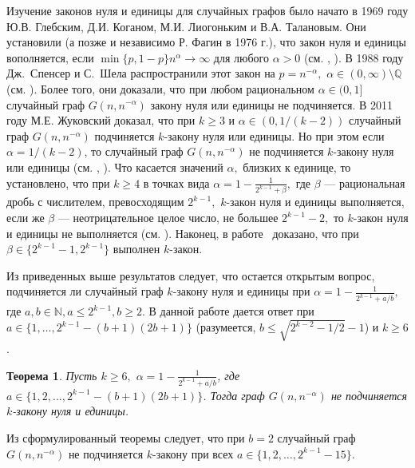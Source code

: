 \documentclass[12pt,a4paper,russian,titlepage]{article}
\newtheorem{Th}{Теорема}
\begin{document}
Изучение законов нуля и единицы для случайных графов было начато в 1969 году Ю.В. Глебским, Д.И. Коганом,
М.И. Лиогоньким и В.А. Талановым. Они установили (а позже и независимо Р. Фагин в 1976 г.), что закон нуля и единицы вополняется, если  $\min\{p,1-p\}n^\alpha \rightarrow \infty $ для любого $\alpha > 0$ (см. \cite{Glebskii}, \cite{Fagin}). В 1988 году Дж.~Спенсер и С.~Шела распространили этот закон на $p = n^{-\alpha},$ $\alpha \in (0, \infty) \setminus \mathbb{Q}$ (см. \cite{Shelah}). Более того, они доказали, что при любом рациональном $\alpha\in(0,1]$ случайный граф $G(n,n^{-\alpha})$ закону нуля или единицы не подчиняется. В 2011 году М.Е. Жуковский доказал, что при $k\geq 3$ и $\alpha\in(0,1/(k-2))$ случайный граф $G(n,n^{-\alpha})$ подчиняется $k$-закону нуля или единицы. Но при этом если $\alpha=1/(k-2)$, то случайный граф $G(n,n^{-\alpha})$ не подчиняется $k$-закону нуля или единицы (см. \cite{Zhuk_dan}, \cite{Zhuk_law}). Что касается значений $\alpha,$ близких к единице, то установлено, что при $k\geq 4$ в точках вида $\alpha = 1 - \frac{1}{2^{k-1} + \beta}, $ где $\beta$ --- рациональная дробь с числителем, превосходящим $2^{k-1},$ $k$-закон нуля и единицы выполняется, если же $\beta$ --- неотрицательное целое число, не большее $2^{k-1} -2,$ то $k$-закон нуля и единицы не выполняется (см. \cite{Zhuk_first}). Наконец, в работе~\cite{Zhuk_second} доказано, что при $\beta\in\{2^{k-1}-1,2^{k-1}\}$ выполнен $k$-закон.

Из приведенных выше результатов следует, что остается открытым вопрос, подчиняется ли случайный граф $k$-закону нуля и единицы при $\alpha = 1 - \frac{1}{2^{k-1} + a/b},$ где
$a,b \in \mathbb{N}, a \leq 2^{k-1}, b \geq 2.$ В данной работе дается ответ при $a\in\{1,\ldots,2^{k-1} - (b+1)(2b+1)\}$ (разумеется, $b\leq\sqrt{2^{k-2}-1/2}-1$) и $k\geq 6$.

\begin{Th}
Пусть $k\geq 6,$ $\alpha = 1 - \frac{1}{2^{k-1} + a/b}$, где $a \in \{1, 2, ..., 2^{k-1} - (b+1)(2b+1)\}$. Тогда граф $G(n, n^{-\alpha})$ не подчиняется $k$-закону нуля и единицы.
\label{main}
\end{Th}

Из сформулированный теоремы следует, что при $b=2$ случайный граф $G(n,n^{-\alpha})$ не подчиняется $k$-закону при всех $a\in\{1,2,\ldots,2^{k-1}-15\}$.

\end{document}
